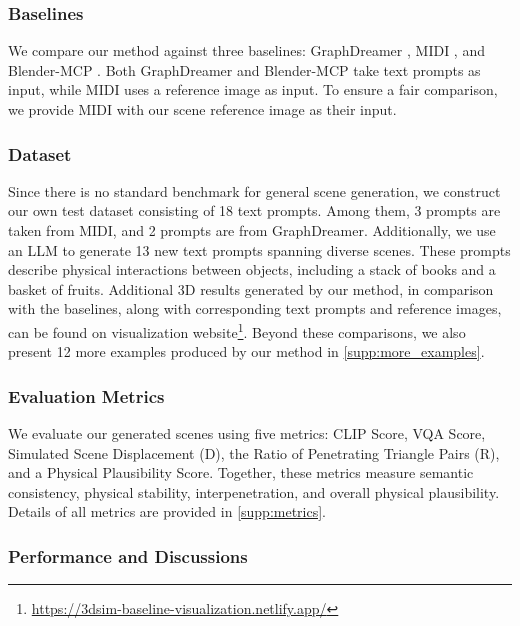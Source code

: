 \subsubsection{Baselines}

We compare our method against three baselines: GraphDreamer \cite{gao2024graphdreamer}, MIDI \cite{huang2024midi}, and Blender-MCP \cite{blender_mcp}. Both GraphDreamer and Blender-MCP take text prompts as input, while MIDI uses a reference image as input. To ensure a fair comparison, we provide MIDI with our scene reference image as their input. 



\subsubsection{Dataset}

Since there is no standard benchmark for general scene generation, we construct our own test dataset consisting of 18 text prompts. Among them, 3 prompts are taken from MIDI, and 2 prompts are from GraphDreamer. Additionally, we use an LLM to generate 13 new text prompts spanning diverse scenes. These prompts describe physical interactions between objects, including a stack of books and a basket of fruits. Additional 3D results generated by our method, in comparison with the baselines, along with corresponding text prompts and reference images, can be found on visualization website\footnote{\url{https://3dsim-baseline-visualization.netlify.app/}}. Beyond these comparisons, we also present 12 more examples produced by our method in \autoref{supp:more_examples}.

\subsubsection{Evaluation Metrics}

We evaluate our generated scenes using five metrics: CLIP Score\cite{radford2021learningtransferablevisualmodels}, VQA Score\cite{lin2024evaluatingtexttovisualgenerationimagetotext}, Simulated Scene Displacement (D), the Ratio of Penetrating Triangle Pairs (R), and a Physical Plausibility Score. Together, these metrics measure semantic consistency, physical stability, interpenetration, and overall physical plausibility. Details of all metrics are provided in \autoref{supp:metrics}.

\subsubsection{Performance and Discussions}

